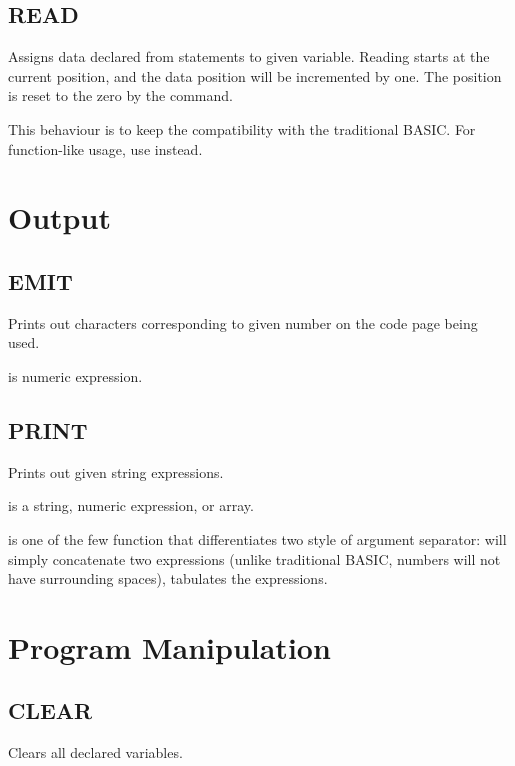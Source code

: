     \subsection{READ}
        \par
        Assigns data declared from  statements to given variable. Reading starts at the current  position, and the data position will be incremented by one. The position is reset to the zero by the  command.\par
        This behaviour is to keep the compatibility with the traditional BASIC. For function-like usage, use  instead.
        
\section{Output}

    \subsection{EMIT}
        \par
        Prints out characters corresponding to given number on the code page being used.\par
         is numeric expression.
    \subsection{PRINT}
        \par
        Prints out given string expressions.\par
         is a string, numeric expression, or array.\par
         is one of the few function that differentiates two style of argument separator: \codebf{;} will simply concatenate two expressions (unlike traditional BASIC, numbers will not have surrounding spaces), \codebf{,} tabulates the expressions.

\section{Program Manipulation}

    \subsection{CLEAR}
        \par
        Clears all declared variables.
